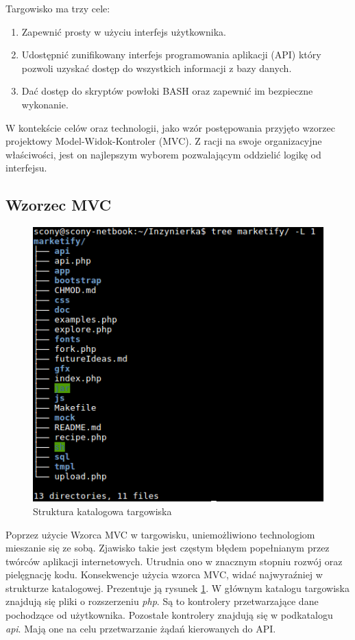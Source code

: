 \documentclass[11pt,a4paper,polish,thesis]{dcsbook}
\begin{document}
Targowisko ma trzy cele:
\begin{enumerate}
\item Zapewnić prosty w użyciu interfejs użytkownika.
\item Udostępnić zunifikowany interfejs programowania aplikacji (API) który pozwoli uzyskać dostęp do wszystkich informacji z bazy danych.
\item Dać dostęp do skryptów powłoki BASH oraz zapewnić im bezpieczne wykonanie.
\end{enumerate}

W kontekście celów oraz technologii, jako wzór postępowania przyjęto wzorzec projektowy Model-Widok-Kontroler (MVC). Z racji na swoje organizacyjne właściwości, jest
on najlepszym wyborem pozwalającym oddzielić logikę od interfejsu.
\subsection{Wzorzec MVC}
\begin{figure}[H]
  \centering
  \includegraphics[scale=0.7]{./resources/market_tree.png}
  \caption{Struktura katalogowa targowiska}
  \label{fig:market_tree}
\end{figure}
Poprzez użycie Wzorca MVC w targowisku, uniemożliwiono technologiom mieszanie się ze sobą. Zjawisko takie jest częstym błędem popełnianym przez twórców aplikacji
internetowych. Utrudnia ono w znacznym stopniu rozwój oraz pielęgnację kodu. Konsekwencje użycia wzorca MVC, widać najwyraźniej w strukturze katalogowej.
Prezentuje ją rysunek \ref{fig:market_tree}.
W głównym katalogu targowiska znajdują się pliki o rozszerzeniu \emph{php}. Są to kontrolery przetwarzające dane pochodzące od użytkownika. Pozostałe kontrolery
znajdują się w podkatalogu \emph{api}. Mają one na celu przetwarzanie żądań kierowanych do API.
\end{document}
